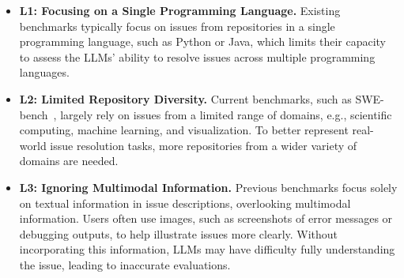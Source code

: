 \begin{itemize}[left=10pt]
    \item \textbf{L1: Focusing on a Single Programming Language.} Existing benchmarks typically focus on issues from repositories in a single programming language, such as Python or Java, which limits their capacity to assess the LLMs' ability to resolve issues across multiple programming languages.



    \item \textbf{L2: Limited Repository Diversity.} Current benchmarks, such as SWE-bench~\cite{jimenez2023swe}, largely rely on issues from a limited range of domains, e.g., scientific computing, machine learning, and visualization. To better represent real-world issue resolution tasks, more repositories from a wider variety of domains are needed.

   \item \textbf{L3: Ignoring Multimodal Information.} Previous benchmarks focus solely on textual information in issue descriptions, overlooking multimodal information. Users often use images, such as screenshots of error messages or debugging outputs, to help illustrate issues more clearly. %
   Without incorporating this information, LLMs may have difficulty fully understanding the issue, leading to inaccurate evaluations. %


\end{itemize}





